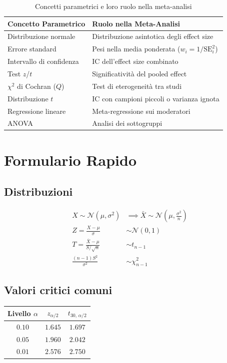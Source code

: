 \documentclass[12pt, a4paper]{article}
\newcommand{\N}{\mathcal{N}}
\begin{document}
\begin{table}[h!]
  \centering
  \caption{Concetti parametrici e loro ruolo nella meta-analisi}
  \begin{tabular}{p{4.5cm} p{7.5cm}}
    \toprule
    \textbf{Concetto Parametrico} & \textbf{Ruolo nella Meta-Analisi} \\
    \midrule
    Distribuzione normale      & Distribuzione asintotica degli effect size \\
    Errore standard            & Pesi nella media ponderata ($w_i = 1/\text{SE}_i^2$) \\
    Intervallo di confidenza   & IC dell'effect size combinato \\
    Test $z$/$t$               & Significatività del pooled effect \\
    $\chi^2$ di Cochran ($Q$)  & Test di eterogeneità tra studi \\
    Distribuzione $t$          & IC con campioni piccoli o varianza ignota \\
    Regressione lineare        & Meta-regressione sui moderatori \\
    ANOVA                      & Analisi dei sottogruppi \\
    \bottomrule
  \end{tabular}
\end{table}

\appendix

\section{Formulario Rapido}

\subsection*{Distribuzioni}
\begin{align*}
  X \sim \N(\mu, \sigma^2) &\implies
    \bar{X} \sim \N\!\left(\mu, \frac{\sigma^2}{n}\right) \\[4pt]
  Z = \frac{X-\mu}{\sigma} &\sim \N(0,1) \\[4pt]
  T = \frac{\bar{X}-\mu}{S/\sqrt{n}} &\sim t_{n-1} \\[4pt]
  \frac{(n-1)S^2}{\sigma^2} &\sim \chi^2_{n-1}
\end{align*}

\subsection*{Valori critici comuni}
\begin{center}
\begin{tabular}{ccc}
  \toprule
  Livello $\alpha$ & $z_{\alpha/2}$ & $t_{30,\,\alpha/2}$ \\
  \midrule
  $0.10$ & $1.645$ & $1.697$ \\
  $0.05$ & $1.960$ & $2.042$ \\
  $0.01$ & $2.576$ & $2.750$ \\
  \bottomrule
\end{tabular}
\end{center}
\end{document}
